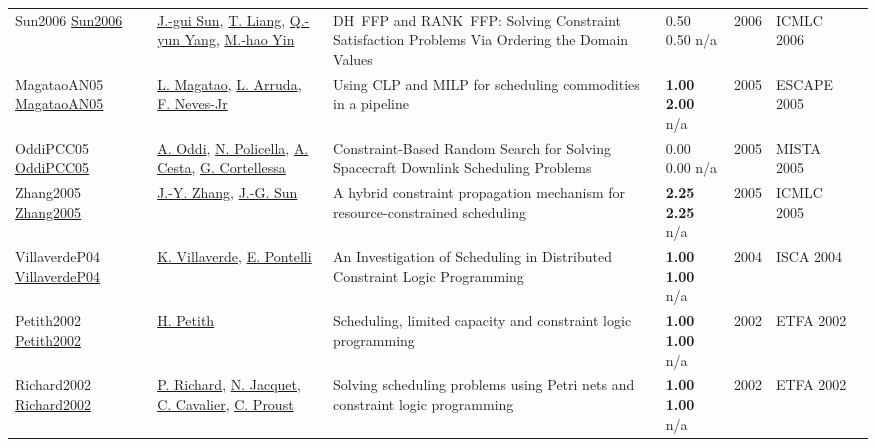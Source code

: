 {\begin{longtable}{p{3cm}p{5cm}p{10cm}p{1cm}rp{2.5cm}l}
Sun2006 \href{http://dx.doi.org/10.1109/icmlc.2006.258879}{Sun2006} & \hyperref[auth:a1696]{J.-gui Sun}, \hyperref[auth:a1697]{T. Liang}, \hyperref[auth:a1698]{Q.-yun Yang}, \hyperref[auth:a1699]{M.-hao Yin} & DH\ FFP and RANK\ FFP: Solving Constraint Satisfaction Problems Via Ordering the Domain Values & \noindent{}0.50 0.50 n/a & 2006 & ICMLC 2006 & \cite{Sun2006}\\
MagataoAN05 \href{https://www.sciencedirect.com/science/article/pii/S1570794605800136}{MagataoAN05} & \hyperref[auth:a1469]{L. Magatao}, \hyperref[auth:a1470]{L. Arruda}, \hyperref[auth:a1471]{F. Neves-Jr} & Using CLP and MILP for scheduling commodities in a pipeline & \noindent{}\textbf{1.00} \textbf{2.00} n/a & 2005 & ESCAPE 2005 & \cite{MagataoAN05}\\
OddiPCC05 \href{http://dx.doi.org/10.1007/0-387-27744-7_7}{OddiPCC05} & \hyperref[auth:a282]{A. Oddi}, \hyperref[auth:a283]{N. Policella}, \hyperref[auth:a284]{A. Cesta}, \hyperref[auth:a285]{G. Cortellessa} & Constraint-Based Random Search for Solving Spacecraft Downlink Scheduling Problems & \noindent{}\textcolor{black!50}{0.00} \textcolor{black!50}{0.00} n/a & 2005 & MISTA 2005 & \cite{OddiPCC05}\\
Zhang2005 \href{http://dx.doi.org/10.1109/icmlc.2004.1380769}{Zhang2005} & \hyperref[auth:a1901]{J.-Y. Zhang}, \hyperref[auth:a1902]{J.-G. Sun} & A hybrid constraint propagation mechanism for resource-constrained scheduling & \noindent{}\textbf{2.25} \textbf{2.25} n/a & 2005 & ICMLC 2005 & \cite{Zhang2005}\\
VillaverdeP04 \href{}{VillaverdeP04} & \hyperref[auth:a658]{K. Villaverde}, \hyperref[auth:a33]{E. Pontelli} & An Investigation of Scheduling in Distributed Constraint Logic Programming & \noindent{}\textbf{1.00} \textbf{1.00} n/a & 2004 & ISCA 2004 & \cite{VillaverdeP04}\\
Petith2002 \href{http://dx.doi.org/10.1109/etfa.1995.496657}{Petith2002} & \hyperref[auth:a2035]{H. Petith} & Scheduling, limited capacity and constraint logic programming & \noindent{}\textbf{1.00} \textbf{1.00} n/a & 2002 & ETFA 2002 & \cite{Petith2002}\\
Richard2002 \href{http://dx.doi.org/10.1109/etfa.1995.496763}{Richard2002} & \hyperref[auth:a1684]{P. Richard}, \hyperref[auth:a1894]{N. Jacquet}, \hyperref[auth:a1895]{C. Cavalier}, \hyperref[auth:a1685]{C. Proust} & Solving scheduling problems using Petri nets and constraint logic programming & \noindent{}\textbf{1.00} \textbf{1.00} n/a & 2002 & ETFA 2002 & \cite{Richard2002}\\

\end{longtable}}
